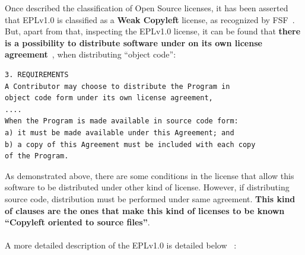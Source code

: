\documentclass[a4paper, 12pt]{book}
\begin{document}
Once described the classification of Open Source licenses, it has been asserted that EPLv1.0 is classified as a \textbf{Weak Copyleft} license, as recognized by FSF~\cite{FSFEPL}. But, apart from that, inspecting the EPLv1.0 license, it can be found that \textbf{there is a possibility to distribute software under on its own license agreement}~\cite{EPLv1}, when distributing ``object code'':
\begin{verbatim}
3. REQUIREMENTS
A Contributor may choose to distribute the Program in
object code form under its own license agreement,
....
When the Program is made available in source code form:
a) it must be made available under this Agreement; and
b) a copy of this Agreement must be included with each copy
of the Program.
\end{verbatim}
As demonstrated above, there are some conditions in the license that allow this software to be distributed under other kind of license. However, if distributing source code, distribution must be performed under same agreement. \textbf{This kind of clauses are the ones that make this kind of licenses to be known ``Copyleft oriented to source files''}.\\
\\
A more detailed description of the EPLv1.0 is detailed below ~\cite{EPLv1overview}:
\end{document}
